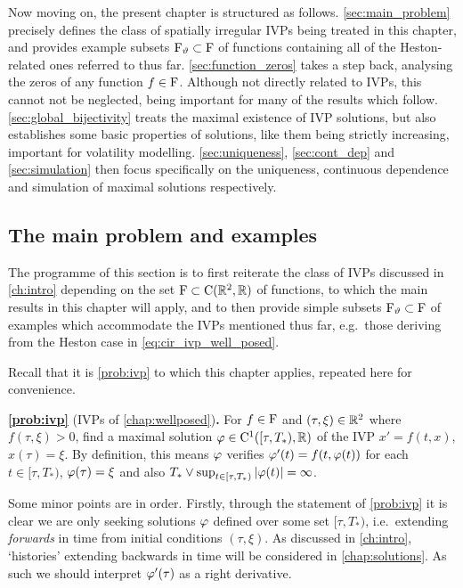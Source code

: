 \vspace{2mm}
Now moving on, the present chapter is structured as follows. \autoref{sec:main_problem} precisely defines the class of spatially irregular IVPs being treated in this chapter, and provides example subsets $\mathrm{F}_\vartheta\subset\mathrm{F}$ of functions containing all of the Heston-related ones referred to thus far. \autoref{sec:function_zeros} takes a step back, analysing the zeros of any function $f\in\mathrm{F}$. Although not directly related to IVPs, this cannot not be neglected, being important for many of the results which follow. \autoref{sec:global_bijectivity} treats the maximal existence of IVP solutions, but also establishes some basic properties of solutions, like them being strictly increasing, important for volatility modelling. \autoref{sec:uniqueness}, \autoref{sec:cont_dep} and \autoref{sec:simulation} then focus specifically on the uniqueness, continuous dependence and simulation of maximal solutions respectively.

\subsection{The main problem and examples}\label{sec:main_problem}

The programme of this section is to first reiterate the class of IVPs discussed in \autoref{ch:intro} depending on the set $\mathrm{F}\subset\mathrm{C}(\mathbb{R}^2,\mathbb{R})$ of functions, to which the main results in this chapter will apply, and to then provide simple subsets $\mathrm{F}_\vartheta\subset\mathrm{F}$ of examples which accommodate the IVPs mentioned thus far, e.g.~those deriving from the Heston case in \autoref{eq:cir_ivp_well_posed}.

Recall that it is \autoref{prob:ivp} to which this chapter applies, repeated here for convenience.

\textbf{\autoref{prob:ivp}} (IVPs of \autoref{chap:wellposed})\textbf{.}
    For $f\in \mathrm{F}$ and $(\tau,\xi)\in\mathbb{R}^2$ where $f(\tau,\xi)>0$, find a maximal solution $\varphi\in\mathrm{C}^1([\tau,T_*),\mathbb{R})$ of the IVP $x'=f(t,x)$, $x(\tau)=\xi$. By definition, this means $\varphi$ verifies $\varphi'(t)=f(t,\varphi(t))$ for each $t\in[\tau,T_*)$, $\varphi(\tau)=\xi$ and also $T_*\vee\sup_{t\in[\tau,T_*)}|\varphi(t)|=\infty$.

Some minor points are in order. Firstly, through the statement of \autoref{prob:ivp} it is clear we are only seeking solutions $\varphi$ defined over some set $[\tau,T_*)$, i.e.~extending \emph{forwards} in time from initial conditions $(\tau,\xi)$. As discussed in \autoref{ch:intro}, `histories' extending backwards in time will be considered in \autoref{chap:solutions}. As such we should interpret $\varphi'(\tau)$ as a right derivative.

